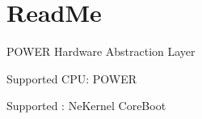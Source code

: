 \chapter{Read\+Me}
\hypertarget{md_dev_2kernel_2_h_a_l_kit_2_p_o_w_e_r_2_read_me}{}\label{md_dev_2kernel_2_h_a_l_kit_2_p_o_w_e_r_2_read_me}
POWER Hardware Abstraction Layer


\begin{DoxyItemize}
\item Supported CPU\+: POWER
\item Supported \+: Ne\+Kernel Core\+Boot 
\end{DoxyItemize}